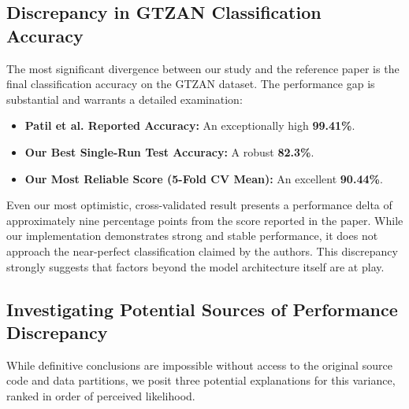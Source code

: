 \documentclass[11pt,a4paper]{article}
\begin{document}
\subsection{Discrepancy in GTZAN Classification Accuracy}
The most significant divergence between our study and the reference paper is the final classification accuracy on the GTZAN dataset. The performance gap is substantial and warrants a detailed examination:
\begin{itemize}
    \item \textbf{Patil et al. Reported Accuracy:} An exceptionally high \textbf{99.41\%}.
    \item \textbf{Our Best Single-Run Test Accuracy:} A robust \textbf{82.3\%}.
    \item \textbf{Our Most Reliable Score (5-Fold CV Mean):} An excellent \textbf{90.44\%}.
\end{itemize}
Even our most optimistic, cross-validated result presents a performance delta of approximately nine percentage points from the score reported in the paper. While our implementation demonstrates strong and stable performance, it does not approach the near-perfect classification claimed by the authors. This discrepancy strongly suggests that factors beyond the model architecture itself are at play.

\subsection{Investigating Potential Sources of Performance Discrepancy}
While definitive conclusions are impossible without access to the original source code and data partitions, we posit three potential explanations for this variance, ranked in order of perceived likelihood.
\end{document}
